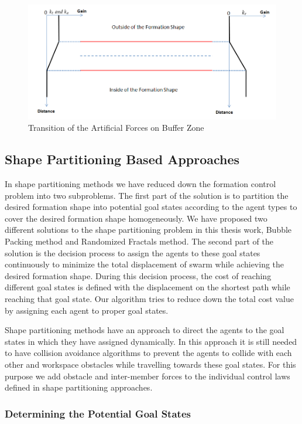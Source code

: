 \begin{figure}[H]
\caption{Transition of the Artificial Forces on Buffer Zone}
\centering
\includegraphics[scale = 0.50]{buffer_zone}
\end{figure}
					
\subsection{Shape Partitioning Based Approaches} \label{shapepartition_ref}
In shape partitioning methods we have reduced down the formation control problem into two subproblems. The first part of the solution is to partition the desired formation shape into potential goal states according to the agent types to cover the desired formation shape homogeneously. We have proposed two different solutions to the shape partitioning problem in this thesis work, Bubble Packing method and Randomized Fractals method. The second part of the solution is the decision process to assign the agents to these goal states continuously to minimize the total displacement of swarm while achieving the desired formation shape. During this decision process, the cost of reaching different goal states is defined with the displacement on the shortest path while reaching that goal state. Our algorithm tries to reduce down the total cost value by assigning each agent to proper goal states.

Shape partitioning methods have an approach to direct the agents to the goal states in which they have assigned dynamically. In this approach it is still needed to have collision avoidance algorithms to prevent the agents to collide with each other and workspace obstacles while travelling towards these goal states. For this purpose we add obstacle and inter-member forces to the individual control laws defined in shape partitioning approaches.
			
\subsubsection{Determining the Potential Goal States} \label{Partitioning_ref}
